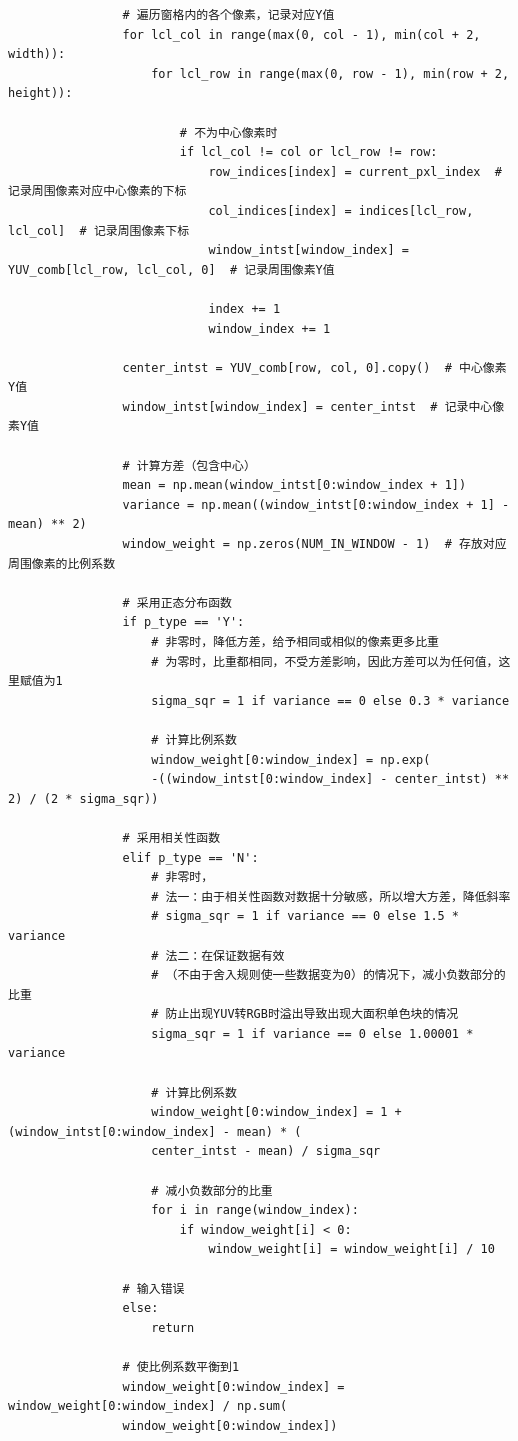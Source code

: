 \documentclass[12pt, a4paper, oneside]{report}
\begin{document}
\begin{lstlisting}
				# 遍历窗格内的各个像素，记录对应Y值
				for lcl_col in range(max(0, col - 1), min(col + 2, width)):
					for lcl_row in range(max(0, row - 1), min(row + 2, height)):
						
						# 不为中心像素时
						if lcl_col != col or lcl_row != row:
							row_indices[index] = current_pxl_index  # 记录周围像素对应中心像素的下标
							col_indices[index] = indices[lcl_row, lcl_col]  # 记录周围像素下标
							window_intst[window_index] = YUV_comb[lcl_row, lcl_col, 0]  # 记录周围像素Y值
							
							index += 1
							window_index += 1
				
				center_intst = YUV_comb[row, col, 0].copy()  # 中心像素Y值
				window_intst[window_index] = center_intst  # 记录中心像素Y值
				
				# 计算方差（包含中心）
				mean = np.mean(window_intst[0:window_index + 1])
				variance = np.mean((window_intst[0:window_index + 1] - mean) ** 2)
				window_weight = np.zeros(NUM_IN_WINDOW - 1)  # 存放对应周围像素的比例系数
				
				# 采用正态分布函数
				if p_type == 'Y':
					# 非零时，降低方差，给予相同或相似的像素更多比重
					# 为零时，比重都相同，不受方差影响，因此方差可以为任何值，这里赋值为1
					sigma_sqr = 1 if variance == 0 else 0.3 * variance
					
					# 计算比例系数
					window_weight[0:window_index] = np.exp(
					-((window_intst[0:window_index] - center_intst) ** 2) / (2 * sigma_sqr))
				
				# 采用相关性函数
				elif p_type == 'N':
					# 非零时，
					# 法一：由于相关性函数对数据十分敏感，所以增大方差，降低斜率
					# sigma_sqr = 1 if variance == 0 else 1.5 * variance
					# 法二：在保证数据有效
					# （不由于舍入规则使一些数据变为0）的情况下，减小负数部分的比重
					# 防止出现YUV转RGB时溢出导致出现大面积单色块的情况
					sigma_sqr = 1 if variance == 0 else 1.00001 * variance
					
					# 计算比例系数
					window_weight[0:window_index] = 1 + (window_intst[0:window_index] - mean) * (
					center_intst - mean) / sigma_sqr
					
					# 减小负数部分的比重
					for i in range(window_index):
						if window_weight[i] < 0:
							window_weight[i] = window_weight[i] / 10
				
				# 输入错误
				else:
					return
				
				# 使比例系数平衡到1
				window_weight[0:window_index] = window_weight[0:window_index] / np.sum(
				window_weight[0:window_index])
				

\end{lstlisting}
\end{document}
